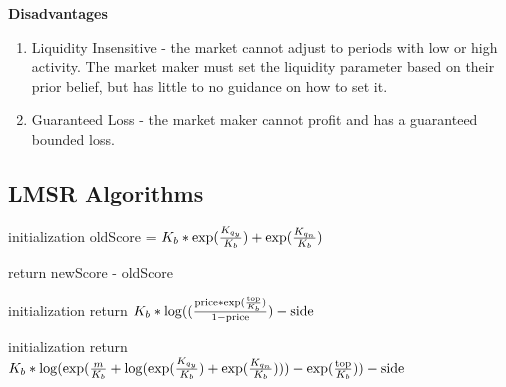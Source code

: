 \textbf{Disadvantages} \\
\begin{enumerate}
\item{Liquidity Insensitive - the market cannot adjust to periods with low or high activity. The market maker must set the liquidity parameter based on their prior belief, but has little to no guidance on how to set it.}
\item{Guaranteed Loss - the market maker cannot profit and has a guaranteed bounded loss.}
\end{enumerate}

\subsection{LMSR Algorithms}
\begin{algorithm}[H]
\SetAlgoLined
{}
initialization\;
oldScore = $K_b * \exp(\frac{K_{q_y}}{K_b}) + \exp(\frac{K_{q_n}}{K_b})$\;

return newScore - oldScore\;
\end{algorithm}

\begin{algorithm}[H]
\SetAlgoLined
{}
initialization\;
return $K_b * \log((\frac{\text{price}*\exp(\frac{\text{top}}{K_b})}{1-\text{price}}) - \text{side}$\;
\end{algorithm}

\begin{algorithm}[H]
\SetAlgoLined
{}
initialization\;
return $K_b * 
\log(
	\exp(
		\frac{m}{K_b} + 
		\log(
			\exp(\frac{K_{q_y}}{K_b}) + 
			\exp(\frac{K_{q_n}}{K_b})
		)
	) - 
	\exp(\frac{\text{top}}{K_b}
	)
) - \text{side}$\;
\end{algorithm}

